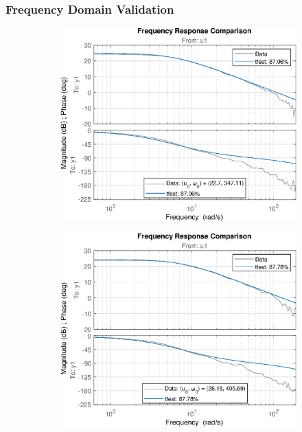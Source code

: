 \subsubsection{Frequency Domain Validation}
\begin{figure}[H]
    \begin{minipage}{0.32\textwidth}
       \begin{figure}[H]
            \includegraphics[width = \textwidth]{./figs/small_perturbation/freq_Compare_1250.eps}
       \end{figure}
    \end{minipage}
    \begin{minipage}{0.32\textwidth}
       \begin{figure}[H]
            \includegraphics[width = \textwidth]{./figs/small_perturbation/freq_Compare_1300.eps}

\end{figure}
\end{minipage}
\end{figure}
